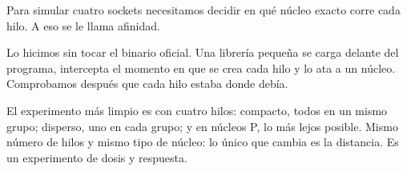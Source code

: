 Para simular cuatro sockets necesitamos decidir en qué núcleo exacto corre cada hilo. A eso se le llama afinidad.

Lo hicimos sin tocar el binario oficial. Una librería pequeña se carga delante del programa, intercepta el momento en que se crea cada hilo y lo ata a un núcleo. Comprobamos después que cada hilo estaba donde debía.

El experimento más limpio es con cuatro hilos: compacto, todos en un mismo grupo; disperso, uno en cada grupo; y en núcleos P, lo más lejos posible. Mismo número de hilos y mismo tipo de núcleo: lo único que cambia es la distancia. Es un experimento de dosis y respuesta.
